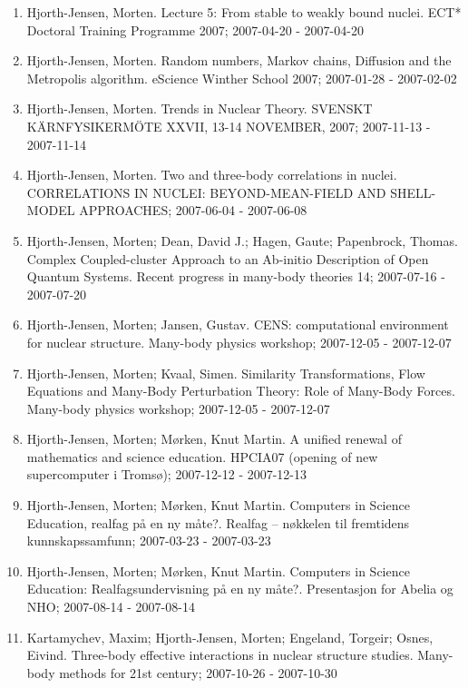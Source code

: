 \documentclass[%
oneside,                 %
final,                   %
10pt]{article}
\begin{document}
\begin{enumerate}
\item Hjorth-Jensen, Morten.  Lecture 5: From stable to weakly bound nuclei. ECT* Doctoral Training Programme 2007; 2007-04-20 - 2007-04-20

\item Hjorth-Jensen, Morten.  Random numbers, Markov chains, Diffusion and the Metropolis algorithm. eScience Winther School 2007; 2007-01-28 - 2007-02-02

\item Hjorth-Jensen, Morten.  Trends in Nuclear Theory. SVENSKT KÄRNFYSIKERMÖTE XXVII, 13-14 NOVEMBER, 2007; 2007-11-13 - 2007-11-14

\item Hjorth-Jensen, Morten.  Two and three-body correlations in nuclei. CORRELATIONS IN NUCLEI: BEYOND-MEAN-FIELD AND SHELL-MODEL APPROACHES; 2007-06-04 - 2007-06-08

\item Hjorth-Jensen, Morten; Dean, David J.; Hagen, Gaute; Papenbrock, Thomas.  Complex Coupled-cluster Approach to an Ab-initio Description of Open Quantum Systems. Recent progress in many-body theories 14; 2007-07-16 - 2007-07-20

\item Hjorth-Jensen, Morten; Jansen, Gustav.  CENS: computational environment for nuclear structure. Many-body physics workshop; 2007-12-05 - 2007-12-07

\item Hjorth-Jensen, Morten; Kvaal, Simen. Similarity Transformations, Flow Equations and Many-Body Perturbation Theory: Role of Many-Body Forces. Many-body physics workshop; 2007-12-05 - 2007-12-07

\item Hjorth-Jensen, Morten; Mørken, Knut Martin.  A unified renewal of mathematics and science education. HPCIA07 (opening of new supercomputer i Tromsø); 2007-12-12 - 2007-12-13

\item Hjorth-Jensen, Morten; Mørken, Knut Martin. Computers in Science Education, realfag på en ny måte?. Realfag – nøkkelen til fremtidens kunnskapssamfunn; 2007-03-23 - 2007-03-23

\item Hjorth-Jensen, Morten; Mørken, Knut Martin.  Computers in Science Education: Realfagsundervisning på en ny måte?. Presentasjon for Abelia og NHO; 2007-08-14 - 2007-08-14

\item Kartamychev, Maxim; Hjorth-Jensen, Morten; Engeland, Torgeir; Osnes, Eivind.  Three-body effective interactions in nuclear structure studies. Many-body methods for 21st century; 2007-10-26 - 2007-10-30


\end{enumerate}
\end{document}
